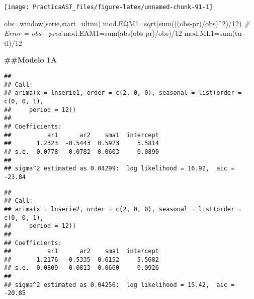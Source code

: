 \documentclass[
]{article}
\newenvironment{Shaded}{\begin{snugshade}}{\end{snugshade}}
\newcommand{\AttributeTok}[1]{\textcolor[rgb]{0.77,0.63,0.00}{#1}}
\newcommand{\CommentTok}[1]{\textcolor[rgb]{0.56,0.35,0.01}{\textit{#1}}}
\newcommand{\DecValTok}[1]{\textcolor[rgb]{0.00,0.00,0.81}{#1}}
\newcommand{\FunctionTok}[1]{\textcolor[rgb]{0.00,0.00,0.00}{#1}}
\newcommand{\NormalTok}[1]{#1}
\newcommand{\OtherTok}[1]{\textcolor[rgb]{0.56,0.35,0.01}{#1}}
\newcommand{\SpecialCharTok}[1]{\textcolor[rgb]{0.00,0.00,0.00}{#1}}
\begin{document}
\begin{center}\texttt{[image: PracticaAST\_files/figure-latex/unnamed-chunk-91-1]} \end{center}

\begin{Shaded}
\begin{Highlighting}[]
\NormalTok{obs}\OtherTok{=}\FunctionTok{window}\NormalTok{(serie,}\AttributeTok{start=}\NormalTok{ultim)}
\NormalTok{mod.EQM1}\OtherTok{=}\FunctionTok{sqrt}\NormalTok{(}\FunctionTok{sum}\NormalTok{(((obs}\SpecialCharTok{{-}}\NormalTok{pr)}\SpecialCharTok{/}\NormalTok{obs)}\SpecialCharTok{\^{}}\DecValTok{2}\NormalTok{)}\SpecialCharTok{/}\DecValTok{12}\NormalTok{)   }\CommentTok{\# Error = obs {-} pred}
\NormalTok{mod.EAM1}\OtherTok{=}\FunctionTok{sum}\NormalTok{(}\FunctionTok{abs}\NormalTok{(obs}\SpecialCharTok{{-}}\NormalTok{pr)}\SpecialCharTok{/}\NormalTok{obs)}\SpecialCharTok{/}\DecValTok{12}
\NormalTok{mod.ML1}\OtherTok{=}\FunctionTok{sum}\NormalTok{(tu}\SpecialCharTok{{-}}\NormalTok{tl)}\SpecialCharTok{/}\DecValTok{12}
\end{Highlighting}
\end{Shaded}

\textbf{\#\#Modelo 1A}

\begin{verbatim}
## 
## Call:
## arima(x = lnserie1, order = c(2, 0, 0), seasonal = list(order = c(0, 0, 1), 
##     period = 12))
## 
## Coefficients:
##          ar1      ar2    sma1  intercept
##       1.2323  -0.5443  0.5923     5.5814
## s.e.  0.0778   0.0782  0.0603     0.0890
## 
## sigma^2 estimated as 0.04299:  log likelihood = 16.92,  aic = -23.84
\end{verbatim}

\begin{verbatim}
## 
## Call:
## arima(x = lnserie2, order = c(2, 0, 0), seasonal = list(order = c(0, 0, 1), 
##     period = 12))
## 
## Coefficients:
##          ar1      ar2    sma1  intercept
##       1.2176  -0.5335  0.6152     5.5682
## s.e.  0.0809   0.0813  0.0660     0.0926
## 
## sigma^2 estimated as 0.04256:  log likelihood = 15.42,  aic = -20.85
\end{verbatim}
\end{document}
